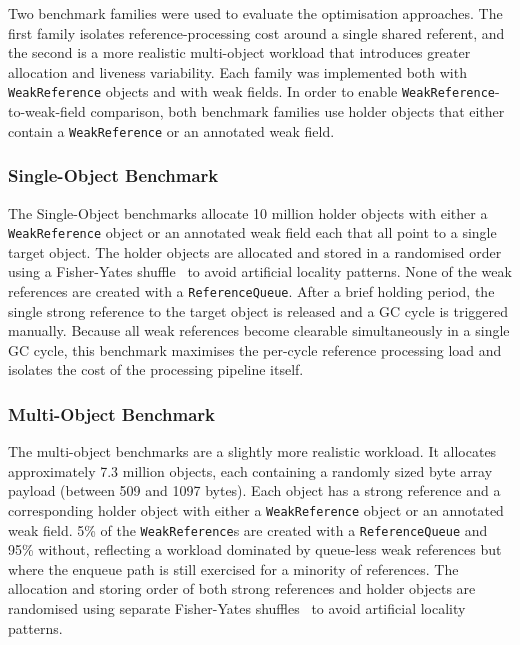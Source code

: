 Two benchmark families were used to evaluate the optimisation approaches. The first family isolates reference-processing cost around a single shared referent, and the second is a more realistic multi-object workload that introduces greater allocation and liveness variability. Each family was implemented both with \texttt{WeakReference} objects and with weak fields. In order to enable \texttt{WeakReference}-to-weak-field comparison, both benchmark families use holder objects that either contain a \texttt{WeakReference} or an annotated weak field.

\subsubsection{Single-Object Benchmark}
\label{subsubsec:single-object-benchmark}

The Single-Object benchmarks allocate 10 million holder objects with either a \texttt{WeakReference} object or an annotated weak field each that all point to a single target object. The holder objects are allocated and stored in a randomised order using a Fisher-Yates shuffle~\cite{knuth97-taocp2} to avoid artificial locality patterns. None of the weak references are created with a \texttt{ReferenceQueue}. After a brief holding period, the single strong reference to the target object is released and a GC cycle is triggered manually. Because all weak references become clearable simultaneously in a single GC cycle, this benchmark maximises the per-cycle reference processing load and isolates the cost of the processing pipeline itself.

\subsubsection{Multi-Object Benchmark}
\label{subsubsec:multi-object-benchmark}

The multi-object benchmarks are a slightly more realistic workload. It allocates approximately 7.3 million objects, each containing a randomly sized byte array payload (between 509 and 1097 bytes). Each object has a strong reference and a corresponding holder object with either a \texttt{WeakReference} object or an annotated weak field. 5\% of the \texttt{WeakReference}s are created with a \texttt{ReferenceQueue} and 95\% without, reflecting a workload dominated by queue-less weak references but where the enqueue path is still exercised for a minority of references. The allocation and storing order of both strong references and holder objects are randomised using separate Fisher-Yates shuffles~\cite{knuth97-taocp2} to avoid artificial locality patterns.

